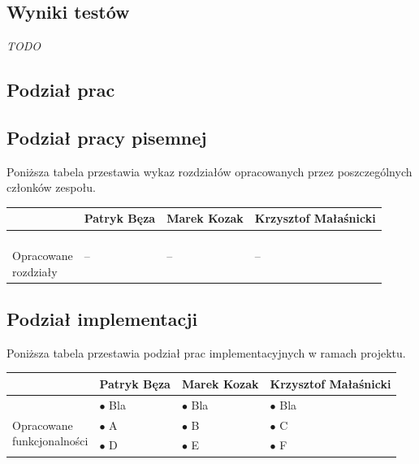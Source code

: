 \documentclass[a4paper,titlepage]{article}
\theoremstyle{break}
\begin{document}

\subsection{Wyniki testów}

\emph{TODO}


\newpage

\begin{appendices}

\section{Podział prac}
\subsection{Podział pracy pisemnej}

Poniższa tabela przestawia wykaz rozdziałów opracowanych przez poszczególnych członków zespołu.

\begin{table}[H]
\center
\begin{tabular}{p{2.5cm}|p{3.3cm}|p{3.3cm}|p{3.3cm}}
& Patryk Bęza & Marek Kozak & Krzysztof Małaśnicki \\\hline\hline
\parbox{3cm}{\ \\Opracowane \\rozdziały} & -- & -- & --\\
\end{tabular}
\end{table}

\subsection{Podział implementacji}

Poniższa tabela przestawia podział prac implementacyjnych w ramach projektu.

\begin{table}[H]
\center
\begin{tabular}{p{2.5cm}|p{3.3cm}|p{3.3cm}|p{3.3cm}}
& Patryk Bęza & Marek Kozak & Krzysztof Małaśnicki \\\hline\hline
\multirow{3}{*}{\parbox{3cm}{\ \\Opracowane \\funkcjonalności}} & $\bullet$ Bla & $\bullet$ Bla & $\bullet$ Bla\\
& $\bullet$ A & $\bullet$ B & $\bullet$ C \\
& $\bullet$ D & $\bullet$ E & $\bullet$ F \\
\end{tabular}
\end{table}

\end{appendices}


\end{document}
